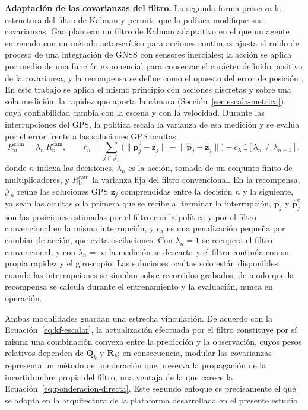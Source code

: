 \textbf{Adaptación de las covarianzas del filtro.}
La segunda forma preserva la estructura del filtro de Kalman y permite que la política modifique sus covarianzas.
Gao \etal{} plantean un filtro de Kalman adaptativo en el que un agente entrenado con un método actor-crítico para acciones continuas ajusta el ruido de proceso de una integración de GNSS con sensores inerciales; la acción se aplica por medio de una función exponencial para conservar el carácter definido positivo de la covarianza, y la recompensa se define como el opuesto del error de posición \cite{gao2020rlakf}.
En este trabajo se aplica el mismo principio con acciones discretas y sobre una sola medición: la rapidez que aporta la cámara (Sección~\ref{sec:escala-metrica}), cuya confiabilidad cambia con la escena y con la velocidad.
Durante las interrupciones del GPS, la política escala la varianza de esa medición y se evalúa por el error frente a las soluciones GPS ocultas:
\begin{equation}
R^{\mathrm{cam}}_n = \lambda_n\, R^{\mathrm{cam}}_{\mathrm{b}},
\qquad
r_n = \sum_{j \in \mathcal{J}_n} \Big( \big\| \hat{\mathbf{p}}^{\mathrm{c}}_j - \mathbf{z}_j \big\| - \big\| \hat{\mathbf{p}}_j - \mathbf{z}_j \big\| \Big) - c_{\lambda}\, \mathbb{1}\!\left[\lambda_n \neq \lambda_{n-1}\right],
\label{eq:rl-covarianzas}
\end{equation}
donde $n$ indexa las decisiones, $\lambda_n$ es la acción, tomada de un conjunto finito de multiplicadores, y $R^{\mathrm{cam}}_{\mathrm{b}}$ la varianza fija del filtro convencional.
En la recompensa, $\mathcal{J}_n$ reúne las soluciones GPS $\mathbf{z}_j$ comprendidas entre la decisión $n$ y la siguiente, ya sean las ocultas o la primera que se recibe al terminar la interrupción, $\hat{\mathbf{p}}_j$ y $\hat{\mathbf{p}}^{\mathrm{c}}_j$ son las posiciones estimadas por el filtro con la política y por el filtro convencional en la misma interrupción, y $c_{\lambda}$ es una penalización pequeña por cambiar de acción, que evita oscilaciones.
Con $\lambda_n = 1$ se recupera el filtro convencional, y con $\lambda_n = \infty$ la medición se descarta y el filtro continúa con su propia rapidez y el giroscopio.
Las soluciones ocultas solo están disponibles cuando las interrupciones se simulan sobre recorridos grabados, de modo que la recompensa se calcula durante el entrenamiento y la evaluación, nunca en operación.

Ambas modalidades guardan una estrecha vinculación.
De acuerdo con la Ecuación~\eqref{eq:kf-escalar}, la actualización efectuada por el filtro constituye por sí misma una combinación convexa entre la predicción y la observación, cuyos pesos relativos dependen de $\mathbf{Q}_k$ y $\mathbf{R}_k$; en consecuencia, modular las covarianzas representa un método de ponderación que preserva la propagación de la incertidumbre propia del filtro, una ventaja de la que carece la Ecuación~\eqref{eq:ponderacion-directa}.
Este segundo enfoque es precisamente el que se adopta en la arquitectura de la plataforma desarrollada en el presente estudio.

